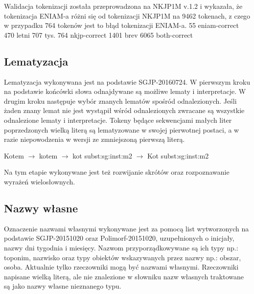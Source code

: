 \documentclass[oneside,pwrcover,withmarginpar,hidelinks,11pt]{article}
\begin{document}

Walidacja tokenizacji została przeprowadzona na NKJP1M v.1.2 i wykazała,
że tokenizacja ENIAM-a różni się od tokenizacji NKJP1M na 9462 tokenach,
z czego w przypadku 764 tokenów jest to błąd tokenizacji ENIAM-a.
55      eniam-correct
470     letni
707     tys.
764     nkjp-correct
1401    brev
6065    both-correct

\subsection{Lematyzacja}

Lematyzacja wykonywana jest na podstawie SGJP-20160724.%
W pierwszym kroku na podstawie końcówki słowa odnajdywane są możliwe lematy i interpretacje.
W drugim kroku następuje wybór znanych lematów spośród odnalezionych.
Jeśli żaden znany lemat nie jest wystąpił wśród odnalezionych zwracane są wszystkie 
odnalezione lematy i interpretacje. %
Tokeny będące sekwencjami małych liter poprzedzonych wielką literą
są lematyzowane w swojej pierwotnej postaci, a w razie niepowodzenia w 
wersji ze zmniejszoną pierwszą literą.
\begin{center}
Kotem $\to$ kotem $\to$ kot subst:sg:inst:m2 $\to$ Kot subst:sg:inst:m2
\end{center}

Na tym etapie wykonywane jest też rozwijanie skrótów oraz rozpoznawanie wyrażeń wielosłownych.


\subsection{Nazwy własne}
Oznaczenie nazwami własnymi wykonywane jest za pomocą list 
wytworzonych na podstawie SGJP-20151020 oraz Polimorf-20151020,
uzupełnionych o inicjały, nazwy dni tygodnia i miesięcy.
Nazwom przyporządkowywane są ich typy np.: toponim, nazwisko
oraz typy obiektów wskazywanych przez nazwy np.: obszar, osoba.
Aktualnie tylko rzeczowniki mogą być nazwami własnymi.
Rzeczowniki napisane wielką literą, ale nie znalezione w słowniku
nazw własnych traktowane są jako nazwy własne nieznanego typu.
\end{document}
